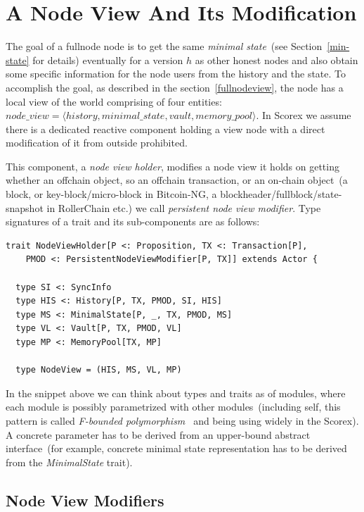 \documentclass[]{report}   %
\begin{document}
\section{A Node View And Its Modification}

The goal of a fullnode node is to get the same \textit{minimal state}~(see Section~\ref{min-state} for details) eventually for a version $h$ as other honest nodes and also obtain some specific information for the node users from the history and the state. To accomplish the goal, as described in the section~\ref{fullnodeview}, the node has a local view of the world comprising of four entities:
\(node\_view = \langle history, minimal\_state, vault, memory\_pool \rangle \). In Scorex we assume there is a dedicated reactive component holding a view node with a direct modification of it from outside prohibited.

This component, a \textit{node view holder}, modifies a node view it holds on getting whether an offchain object, so an offchain transaction, or an on-chain object~(a block, or key-block/micro-block in Bitcoin-NG, a blockheader/fullblock/state-snapshot in RollerChain etc.) we call \textit{persistent node view modifier}. Type signatures of a trait and its sub-components are as follows:

\begin{lstlisting}
trait NodeViewHolder[P <: Proposition, TX <: Transaction[P],
	PMOD <: PersistentNodeViewModifier[P, TX]] extends Actor {

  type SI <: SyncInfo
  type HIS <: History[P, TX, PMOD, SI, HIS]
  type MS <: MinimalState[P, _, TX, PMOD, MS]
  type VL <: Vault[P, TX, PMOD, VL]
  type MP <: MemoryPool[TX, MP]

  type NodeView = (HIS, MS, VL, MP)
\end{lstlisting}

In the snippet above we can think about types and traits as of modules, where each module is possibly parametrized with other modules~(including self, this pattern is called 
\textit{F-bounded polymorphism~\cite{}} and being using widely in the Scorex). A concrete parameter has to be derived from an upper-bound abstract interface~(for example, concrete minimal state representation has to be derived from the \textit{MinimalState} trait).

\subsection{Node View Modifiers}
\end{document}
